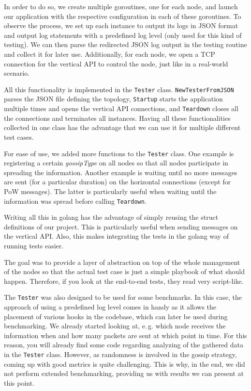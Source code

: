\documentclass[a4paper,english,10pt,NET]{tumarticle}
\renewcommand{\eg}{\mbox{e.\,g.}\xspace} %
\begin{document}
In order to do so, we create multiple goroutines, one for each node, and launch our application with the respective configuration in each of these goroutines.
To observe the process, we set up each instance to output its logs in JSON format and output log statements with a predefined log level (only used for this kind of testing).
We can then parse the redirected JSON log output in the testing routine and collect it for later use.
Additionally, for each node, we open a TCP connection for the vertical API to control the node, just like in a real-world scenario.

All this functionality is implemented in the \texttt{Tester} class.
\texttt{NewTesterFromJSON} parses the JSON file defining the topology,
\texttt{Startup} starts the application multiple times and opens the vertical API connections, and
\texttt{Teardown} closes all the connections and terminates all instances.
Having all these functionalities collected in one class has the advantage that we can use it for multiple different test cases.

For ease of use, we added more functions to the \texttt{Tester} class.
One example is registering a certain \emph{gossipType} on all nodes so that all nodes participate in spreading the information.
Another example is waiting until no more messages are sent (for a particular duration) on the horizontal connections (except for PoW messages).
The latter is particularly useful when waiting until the information was spread before calling \texttt{Teardown}.

Writing all this in golang has the advantage of simply reusing the struct definitions of our project.
This is particularly useful when sending messages on the vertical API.
Also, this makes integrating the tests in the golang way of running tests easier.

The goal was to provide a layer of abstraction on top of the whole management of the nodes so that the actual test case is just a simple playbook of what should happen.
Therefore, if you look at the end-to-end tests, they read very script-like.

The \texttt{Tester} was also designed to be used for some benchmarks.
In this case, the approach of using a predefined log level comes in handy as it allows the placement of various hooks in the codebase, which can later be used during benchmarking.
We already started looking at, \eg which node receives the information when and how many packets are sent at which point in time.
For this reason, you will already find some code regarding analyzing of the gathered data in the \texttt{Tester} class.
However, as randomness is involved in the gossip strategy, coming up with good metrics is quite challenging.
This is why, in the end, we did not perform extended benchmarking, providing us with results we can present at this point.
\end{document}
